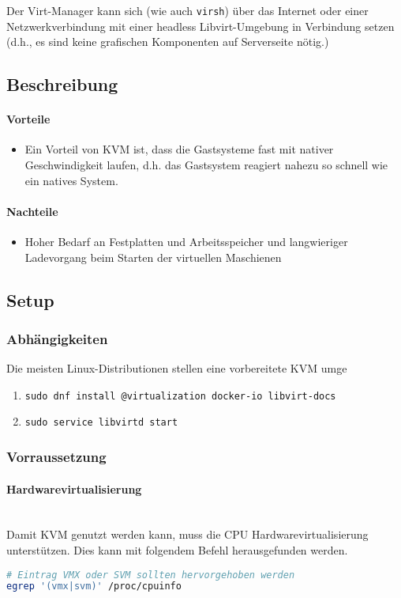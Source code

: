 Der Virt-Manager kann sich (wie auch \lstinline|virsh|) über das Internet oder einer Netzwerkverbindung mit einer headless Libvirt-Umgebung in Verbindung setzen (d.h., es sind keine grafischen Komponenten auf Serverseite nötig.)

\subsection{Beschreibung}
\paragraph{Vorteile}
\begin{itemize}
	\item Ein Vorteil von KVM ist, dass die Gastsysteme fast mit nativer Geschwindigkeit laufen, d.h. das Gastsystem reagiert nahezu so schnell wie ein natives System. 
\end{itemize}
\paragraph{Nachteile}
\begin{itemize}
	\item Hoher Bedarf an Festplatten und Arbeitsspeicher und langwieriger Ladevorgang beim Starten der virtuellen Maschienen
\end{itemize}

\subsection{Setup}
\subsubsection{Abhängigkeiten}
Die meisten Linux-Distributionen stellen eine vorbereitete KVM umge

\begin{enumerate}
	\item \lstinline|sudo dnf install @virtualization docker-io libvirt-docs|
	\item \lstinline|sudo service libvirtd start|
\end{enumerate}

\subsubsection{Vorraussetzung}
\paragraph{Hardwarevirtualisierung} \hfill \\
Damit KVM genutzt werden kann, muss die CPU Hardwarevirtualisierung unterstützen. Dies kann mit folgendem Befehl herausgefunden werden.
\begin{lstlisting}[language=bash]
# Eintrag VMX oder SVM sollten hervorgehoben werden
egrep '(vmx|svm)' /proc/cpuinfo
\end{lstlisting}

